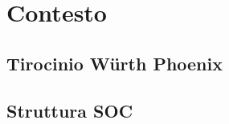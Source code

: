 \chapter{Contesto}
\label{cha:contesto}

\section{Tirocinio Würth Phoenix}
\label{sec:tirocinio}

\lipsum[1]

\section{Struttura SOC}
\label{sec:soc}

\lipsum[1]